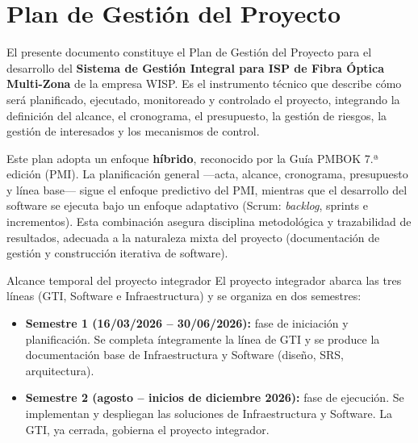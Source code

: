 \chapter{Plan de Gestión del Proyecto}
\label{chap:plangestion}



El presente documento constituye el Plan de Gestión del Proyecto para el desarrollo
del \textbf{Sistema de Gestión Integral para ISP de Fibra Óptica Multi-Zona} de la
empresa WISP. Es el instrumento técnico que describe cómo será planificado,
ejecutado, monitoreado y controlado el proyecto, integrando la definición del
alcance, el cronograma, el presupuesto, la gestión de riesgos, la gestión de
interesados y los mecanismos de control.

Este plan adopta un enfoque \textbf{híbrido}, reconocido por la Guía PMBOK 7.ª
edición (PMI). La planificación general ---acta, alcance, cronograma, presupuesto y
línea base--- sigue el enfoque predictivo del PMI, mientras que el desarrollo del
software se ejecuta bajo un enfoque adaptativo (Scrum: \textit{backlog}, sprints e
incrementos). Esta combinación asegura disciplina metodológica y trazabilidad de
resultados, adecuada a la naturaleza mixta del proyecto (documentación de gestión y
construcción iterativa de software).

\begin{upeubox}{Alcance temporal del proyecto integrador}
El proyecto integrador abarca las tres líneas (GTI, Software e Infraestructura) y se
organiza en dos semestres:
\begin{itemize}[leftmargin=1.4em]
  \item \textbf{Semestre 1 (16/03/2026 -- 30/06/2026):} fase de iniciación y
  planificación. Se completa íntegramente la línea de GTI y se produce la
  documentación base de Infraestructura y Software (diseño, SRS, arquitectura).
  \item \textbf{Semestre 2 (agosto -- inicios de diciembre 2026):} fase de ejecución.
  Se implementan y despliegan las soluciones de Infraestructura y Software. La GTI,
  ya cerrada, gobierna el proyecto integrador.
\end{itemize}
\end{upeubox}

